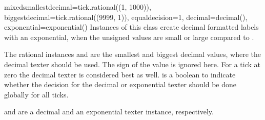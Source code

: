 \begin{classdesc}{mixed}{smallestdecimal=tick.rational((1, 1000)),
                         biggestdecimal=tick.rational((9999, 1)),
                         equaldecision=1,
                         decimal=decimal(),
                         exponential=exponential()}
  Instances of this class create decimal formatted labels with an
  exponential, when the unsigned values are small or large compared to
  .

  The rational instances  and
   are the smallest and biggest decimal values,
  where the decimal texter should be used. The sign of the value is
  ignored here. For a tick at zero the decimal texter is considered
  best as well.  is a boolean to indicate whether
  the decision for the decimal or exponential texter should be done
  globally for all ticks.

   and  are a decimal and an exponential
  texter instance, respectively.
\end{classdesc}

